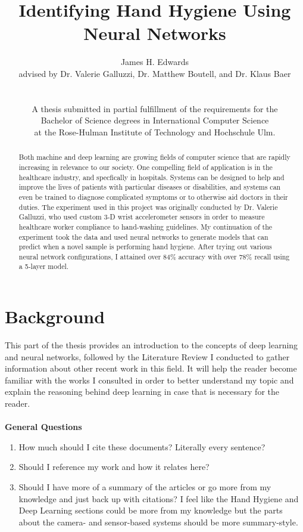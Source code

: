 \documentclass[]{report}
\title{Identifying Hand Hygiene Using Neural Networks}
\author{James H. Edwards \\ 
	advised by Dr. Valerie Galluzzi, Dr. Matthew Boutell, and Dr. Klaus Baer\\
	\\
	\\
	A thesis submitted in partial fulfillment of the requirements for the \\
	Bachelor of Science degrees in International Computer Science \\
	at the Rose-Hulman Institute of Technology and Hochschule Ulm.}
\begin{document}
\maketitle
\tableofcontents

\begin{abstract}
	Both machine and deep learning are growing fields of computer science that are rapidly increasing in relevance to our society. One compelling field of application is in the healthcare industry, and specfically in hospitals. Systems can be designed to help and improve the lives of patients with particular diseases or disabilities, and systems can even be trained to diagnose complicated symptoms or to otherwise aid doctors in their duties. The experiment used in this project was originally conducted by Dr. Valerie Galluzzi, who used custom 3-D wrist accelerometer sensors in order to measure healthcare worker compliance to hand-washing guidelines. My continuation of the experiment took the data and used neural networks to generate models that can predict when a novel sample is performing hand hygiene. After trying out various neural network configurations, I attained over 84\% accuracy with over 78\% recall using a 5-layer model.
\end{abstract}

\chapter{Background}

This part of the thesis provides an introduction to the concepts of deep learning and neural networks, followed by the Literature Review I conducted to gather information about other recent work in this field. It will help the reader become familiar with the works I consulted in order to better understand my topic and explain the reasoning behind deep learning in case that is necessary for the reader.
\\\\
\textbf{General Questions}
\begin{enumerate}
	\item How much should I cite these documents? Literally every sentence?
	\item Should I reference my work and how it relates here?
	\item Should I have more of a summary of the articles or go more from my knowledge and just back up with citations? I feel like the Hand Hygiene and Deep Learning sections could be more from my knowledge but the parts about the camera- and sensor-based systems should be more summary-style.
\end{enumerate}
\end{document}
